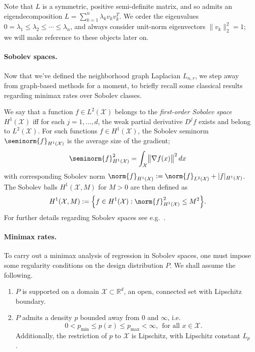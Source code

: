 \documentclass[twoside]{article}
\newcommand{\Reals}{\mathbb{R}}
\newcommand{\1}{\mathbf{1}}
\newcommand{\Rd}{\Reals^d}
\newcommand{\Lap}{L}
\newcommand{\Xset}{\mathcal{X}}
\newcommand{\Leb}{L}
\theoremstyle{definition}
\theoremstyle{remark}
\begin{document}
Note that $L$ is a symmetric, positive semi-definite matrix, and so admits an eigendecomposition $L = \sum_{k = 1}^{n} \lambda_k v_k v_k^T$. We order the eigenvalues $0 = \lambda_1 \leq \lambda_2 \leq \cdots \leq \lambda_n$, and always consider unit-norm eigenvectors $\|v_k\|_2^2 = 1$; we will make reference to these objects later on.

\paragraph{Sobolev spaces.}
Now that we've defined the neighborhood graph Laplacian $\Lap_{n,r}$, we step away from graph-based methods for a moment, to briefly recall some classical results regarding minimax rates over Sobolev classes.

We say that a function $f \in \Leb^2(\Xset)$ belongs to the \emph{first-order Sobolev space} $H^1(\Xset)$ iff for each $j = 1,\ldots,d$, the weak partial derivative $D^jf$ exists and belong to $\Leb^2(\Xset)$. For such functions $f \in H^1(\Xset)$, the Sobolev seminorm $\seminorm{f}_{H^{1}(\Xset)}$ is the average size of the gradient;
\begin{equation*}
\seminorm{f}_{H^1(\Xset)}^2 = \int_{\Xset} \bigl\|\nabla f(x)\bigr\|^2 \,dx
\end{equation*}
with corresponding Sobolev norm $\norm{f}_{H^1(\Xset)} := \norm{f}_{\Leb^2(\Xset)} + |f|_{H^1(\Xset)}$. The Sobolev balls $H^1(\Xset,M)$ for $M > 0$ are then defined as
\begin{equation*}
H^1(\Xset,M) := \Bigl\{f \in H^1(\Xset): \norm{f}_{H^1(\Xset)}^2 \leq M^2\Bigr\}.
\end{equation*}
For further details regarding Sobolev spaces see e.g.~\citet{evans10,leoni2017}.

\paragraph{Minimax rates.}
To carry out a minimax analysis of regression in Sobolev spaces, one must impose some regularity conditions on the design distribution $P$. We shall assume the following.
\begin{enumerate}[label=(P\arabic*)]
	\item
	\label{asmp:domain}
	$P$ is supported on a domain $\Xset \subset \Rd$, an open, connected set with Lipschitz boundary.
	\item
	\label{asmp:bounded_lipschitz_density} 
	$P$ admits a density $p$ bounded away from $0$ and $\infty$, i.e.
	\begin{equation*}
	0 < p_{\min} \leq p(x) \leq p_{\max} < \infty,~~\textrm{for all $x \in \Xset$.}
	\end{equation*}
	Additionally, the restriction of $p$ to $\Xset$ is Lipschitz, with Lipschitz constant $L_p$.
\end{enumerate}
\end{document}
